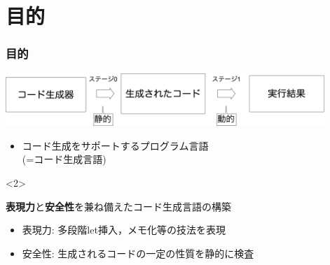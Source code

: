 \section{目的}

\begin{frame}
  \frametitle{目的}
  \medskip
  \flushleft
  \includegraphics[clip,height=2cm]{./img/prggen.png}

  \begin{itemize}
  \item コード生成をサポートするプログラム言語\\(=\alert{コード生成言語})
  \end{itemize}

  \begin{visibleenv}<2>
    \begin{block}{\textbf{表現力}と\textbf{安全性}を兼ね備えたコード生成言語の構築}
      \begin{itemize}
      \item 表現力: 多段階let挿入，メモ化等の技法を表現
      \item 安全性: 生成されるコードの一定の性質を静的に検査
      \end{itemize}
    \end{block}
  \end{visibleenv}

\end{frame}

